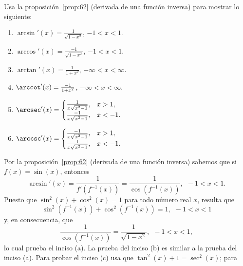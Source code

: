 \documentclass[12pt,a4paper]{book}
\begin{document}
    \begin{ejercicio}\label{ej:256}
        Usa la proposición~\ref{prop:62} (derivada de una función inversa) para mostrar lo
        siguiente:
        \begin{enumerate}[nosep]
            \item $\arcsin'(x)=\frac{1}{\sqrt{1-x^{2}}}$, $-1<x<1$.
            \item $\arccos'(x)=\frac{-1}{\sqrt{1-x^{2}}}$, $-1<x<1$.
            \item $\arctan'(x)=\frac{1}{1+x^{2}}$, $-\infty<x<\infty$.
            \item $\arccot'(x)=\frac{-1}{1+x^{2}}$, $-\infty<x<\infty$.
            \item $\arcsec'(x)=\begin{cases}\frac{1}{x\sqrt{x^{2}-1}}, & x>1,\\ \frac{-1}{x\sqrt{x^{2}-1}}, & x<-1.\end{cases}$
            \item $\arccsc'(x)=\begin{cases}\frac{-1}{x\sqrt{x^{2}-1}}, & x>1,\\ \frac{1}{x\sqrt{x^{2}-1}}, & x<-1.\end{cases}$
        \end{enumerate}
        \sugerencia Por la proposición~\ref{prop:62} (derivada de una función inversa) sabemos
        que si $f(x)=\sin(x)$, entonces
        \begin{equation*}
            \arcsin'(x)=\frac{1}{f'\left(f^{-1}(x)\right)}=\frac{1}{\cos\left(f^{-1}(x)\right)},\ \ -1<x<1.
        \end{equation*}
        Puesto que $\sin^{2}(x)+\cos^{2}(x)=1$ para todo número real $x$, resulta que
        \begin{equation*}
            \sin^{2}\left(f^{-1}(x)\right)+\cos^{2}\left(f^{-1}(x)\right)=1,\ \ -1<x<1
        \end{equation*}
        y, en consecuencia, que
        \begin{equation*}
            \frac{1}{\cos\left(f^{-1}(x)\right)}=\frac{1}{\sqrt{1-x^{2}}},\ \ -1<x<1,
        \end{equation*}
        lo cual prueba el inciso (a). La prueba del inciso (b) es similar a la prueba
        del inciso (a). Para probar el inciso (c) usa que $\tan^{2}(x)+1=\sec^{2}(x)$; para

\end{ejercicio}
\end{document}
